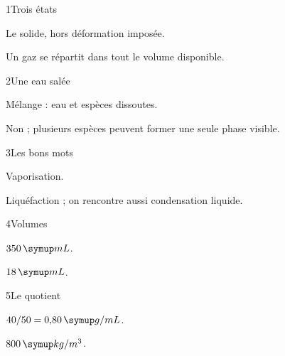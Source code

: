 \par\noindent\begin{minipage}{\linewidth}
\begin{corrige}{1}{Trois états}
\begin{questions}
\item Le solide, hors déformation imposée.
\item Un gaz se répartit dans tout le volume disponible.
\end{questions}
\end{corrige}
\end{minipage}
\par\noindent\begin{minipage}{\linewidth}
\begin{corrige}{2}{Une eau salée}
\begin{questions}
\item Mélange : eau et espèces dissoutes.
\item Non ; plusieurs espèces peuvent former une seule phase visible.
\end{questions}
\end{corrige}
\end{minipage}
\par\noindent\begin{minipage}{\linewidth}
\begin{corrige}{3}{Les bons mots}
\begin{questions}
\item Vaporisation.
\item Liquéfaction ; on rencontre aussi condensation liquide.
\end{questions}
\end{corrige}
\end{minipage}
\par\noindent\begin{minipage}{\linewidth}
\begin{corrige}{4}{Volumes}
\begin{questions}
\item $350\unite{mL}$.
\item $18\unite{mL}$.
\end{questions}
\end{corrige}
\end{minipage}
\par\noindent\begin{minipage}{\linewidth}
\begin{corrige}{5}{Le quotient}
\begin{questions}
\item $40/50=0{,}80\unite{g/mL}$.
\item $800\unite{kg/m^3}$.
\end{questions}
\end{corrige}
\end{minipage}
